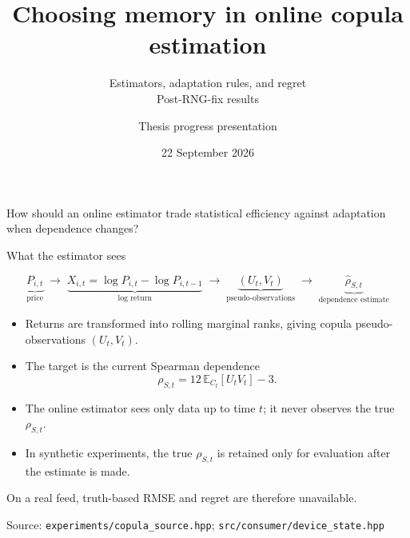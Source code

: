 \documentclass[aspectratio=169,11pt]{beamer}
\title{Choosing memory in online copula estimation}
\subtitle{Estimators, adaptation rules, and regret\\Post-RNG-fix results}
\author{Thesis progress presentation}
\date{22 September 2026}
\newcommand{\src}[1]{\vfill{\tiny\color{gray}Source: #1}}
\begin{document}
\begin{frame}
  \titlepage
  \vspace{-1.0em}
  \begin{center}\small
    How should an online estimator trade statistical efficiency against adaptation
    when dependence changes?
  \end{center}
\end{frame}

\begin{frame}{What the estimator sees}

\[
  \underbrace{P_{i,t}}_{\text{price}}
  \;\longrightarrow\;
  \underbrace{
    X_{i,t}=\log P_{i,t}-\log P_{i,t-1}
  }_{\text{log return}}
  \;\longrightarrow\;
  \underbrace{(U_t,V_t)}_{\text{pseudo-observations}}
  \;\longrightarrow\;
  \underbrace{\widehat\rho_{S,t}}_{\text{dependence estimate}}
\]

  \begin{itemize}
    \item Returns are transformed into rolling marginal ranks,
          giving copula pseudo-observations $(U_t,V_t)$.
    \item The target is the current Spearman dependence
      \[
        \rho_{S,t}=12\,\mathbb E_{C_t}[U_tV_t]-3.
      \]
    \item The online estimator sees only data up to time $t$;
          it never observes the true $\rho_{S,t}$.
    \item In synthetic experiments, the true $\rho_{S,t}$ is retained
          only for evaluation after the estimate is made.
  \end{itemize}

  \smallskip
  \small On a real feed, truth-based RMSE and regret are therefore unavailable.

  \src{\texttt{experiments/copula\_source.hpp};
       \texttt{src/consumer/device\_state.hpp}}
\end{frame}
\end{document}
